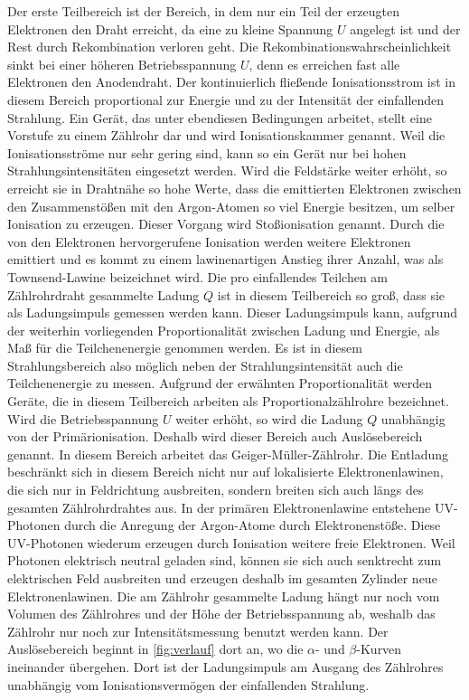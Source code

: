 Der erste Teilbereich ist der Bereich, in dem nur ein Teil der erzeugten Elektronen den Draht erreicht, da eine zu kleine Spannung $U$ angelegt ist 
und der Rest durch Rekombination verloren geht. \newline
Die Rekombinationswahrscheinlichkeit sinkt bei einer höheren Betriebsspannung $U$, denn es erreichen fast alle Elektronen den Anodendraht. 
Der kontinuierlich fließende Ionisationsstrom ist in diesem Bereich proportional zur Energie und zu der Intensität der einfallenden Strahlung. Ein Gerät,
das unter ebendiesen Bedingungen arbeitet, stellt eine Vorstufe zu einem Zählrohr dar und wird Ionisationskammer genannt. Weil die Ionisationsströme nur sehr gering sind, kann so ein Gerät nur bei
hohen Strahlungsintensitäten eingesetzt werden. \newline
Wird die Feldstärke weiter erhöht, so erreicht sie in Drahtnähe so hohe Werte, dass die emittierten Elektronen zwischen den Zusammenstößen mit den Argon-Atomen so viel Energie besitzen, um selber Ionisation zu erzeugen.
Dieser Vorgang wird Stoßionisation genannt. Durch die von den Elektronen hervorgerufene Ionisation werden weitere Elektronen emittiert und es kommt zu einem lawinenartigen Anstieg ihrer Anzahl, was als Townsend-Lawine beizeichnet wird. 
Die pro einfallendes Teilchen am Zählrohrdraht gesammelte Ladung $Q$ ist in diesem Teilbereich so groß, dass sie als Ladungsimpuls gemessen werden kann. Dieser Ladungsimpuls kann, aufgrund der weiterhin vorliegenden Proportionalität zwischen Ladung und Energie,
als Maß für die Teilchenenergie genommen werden. Es ist in diesem Strahlungsbereich also möglich neben der Strahlungsintensität auch die Teilchenenergie zu messen. Aufgrund der erwähnten Proportionalität werden Geräte, die in diesem Teilbereich arbeiten als Proportionalzählrohre bezeichnet. \newline
Wird die Betriebsspannung $U$ weiter erhöht, so wird die Ladung $Q$ unabhängig von der Primärionisation. Deshalb wird dieser Bereich auch Auslösebereich genannt. In diesem Bereich arbeitet das Geiger-Müller-Zählrohr.
Die Entladung beschränkt sich in diesem Bereich nicht nur auf lokalisierte Elektronenlawinen, die sich nur in Feldrichtung ausbreiten, sondern breiten sich auch längs des gesamten Zählrohrdrahtes aus.
In der primären Elektronenlawine entstehene UV-Photonen durch die Anregung der Argon-Atome durch Elektronenstöße. Diese UV-Photonen wiederum erzeugen durch Ionisation weitere freie Elektronen. Weil Photonen elektrisch neutral geladen sind, können sie sich auch senktrecht zum elektrischen Feld ausbreiten
und erzeugen deshalb im gesamten Zylinder neue Elektronenlawinen. Die am Zählrohr  gesammelte Ladung hängt nur noch vom Volumen des Zählrohres und der Höhe der Betriebsspannung ab, weshalb das Zählrohr nur noch zur Intensitätsmessung benutzt werden kann.
Der Auslösebereich beginnt in \autoref{fig:verlauf} dort an, wo die $\alpha$- und $\beta$-Kurven ineinander übergehen. Dort ist der Ladungsimpuls am Ausgang des Zählrohres unabhängig vom Ionisationsvermögen der einfallenden Strahlung.
